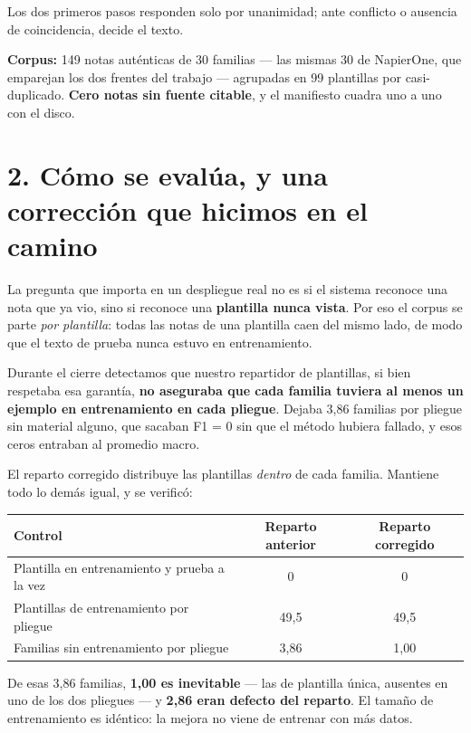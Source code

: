 \documentclass[11pt,a4paper]{article}
\begin{document}
Los dos primeros pasos responden solo por unanimidad; ante conflicto o ausencia de coincidencia,
decide el texto.

\textbf{Corpus:} 149 notas auténticas de 30 familias --- las mismas 30 de NapierOne, que emparejan
los dos frentes del trabajo --- agrupadas en 99 plantillas por casi-duplicado. \textbf{Cero notas
sin fuente citable}, y el manifiesto cuadra uno a uno con el disco.

\section*{2. Cómo se evalúa, y una corrección que hicimos en el camino}

La pregunta que importa en un despliegue real no es si el sistema reconoce una nota que ya vio,
sino si reconoce una \textbf{plantilla nunca vista}. Por eso el corpus se parte \emph{por
plantilla}: todas las notas de una plantilla caen del mismo lado, de modo que el texto de prueba
nunca estuvo en entrenamiento.

Durante el cierre detectamos que nuestro repartidor de plantillas, si bien respetaba esa garantía,
\textbf{no aseguraba que cada familia tuviera al menos un ejemplo en entrenamiento en cada
pliegue}. Dejaba 3,86 familias por pliegue sin material alguno, que sacaban F1 = 0 sin que el
método hubiera fallado, y esos ceros entraban al promedio macro.

El reparto corregido distribuye las plantillas \emph{dentro} de cada familia. Mantiene todo lo
demás igual, y se verificó:

\begin{center}
\small
\begin{tabular}{lcc}
\toprule
\textbf{Control} & \textbf{Reparto anterior} & \textbf{Reparto corregido} \\
\midrule
Plantilla en entrenamiento y prueba a la vez & 0 & 0 \\
Plantillas de entrenamiento por pliegue & 49,5 & 49,5 \\
Familias sin entrenamiento por pliegue & 3,86 & 1,00 \\
\bottomrule
\end{tabular}
\end{center}

De esas 3,86 familias, \textbf{1,00 es inevitable} --- las de plantilla única, ausentes en uno de
los dos pliegues --- y \textbf{2,86 eran defecto del reparto}. El tamaño de entrenamiento es
idéntico: la mejora no viene de entrenar con más datos.
\end{document}
